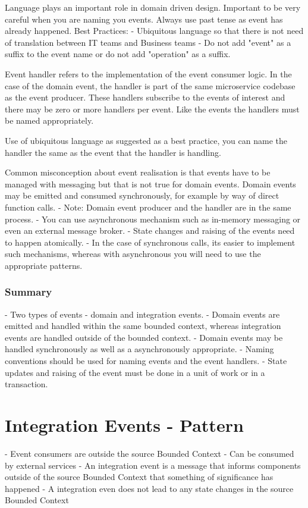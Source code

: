 Language plays an important role in domain driven design. Important to be very careful when you are naming you events.
Always use past tense as event has already happened.
Best Practices:
- Ubiquitous language so that there is not need of translation between IT teams and Business teams
- Do not add "event" as a suffix to the event name or do not add "operation" as a suffix.

Event handler refers to the implementation of the event consumer logic.
In the case of the domain event, the handler is part of the same microservice codebase as the event producer.
These handlers subscribe to the events  of interest and there may be zero or more handlers per event.
Like the events the handlers must be named appropriately.

Use of ubiquitous language as suggested as a best practice, you can name the handler the same as the event that the handler is handling.

Common misconception about event realisation is that events have to be managed with messaging but that is not true for domain events.
Domain events may be emitted and consumed synchronously, for example by way of direct function calls.
- Note: Domain event producer and the handler are in the same process.
- You can use asynchronous mechanism such as in-memory messaging or even an external message broker.
- State changes and raising of the events need to happen atomically.
- In the case of synchronous calls, its easier to implement such mechanisms, whereas with asynchronous you will need to use the appropriate patterns.

\subsubsection{Summary}
- Two types of events - domain and integration events.
- Domain events are emitted and handled within the same bounded context, whereas integration events are handled outside of the bounded context.
- Domain events may be handled synchronously as well as a asynchronously appropriate.
- Naming conventions should be used for naming events and the event handlers.
- State updates and raising of the event must be done in a unit of work or in a transaction.

\section{Integration Events - Pattern}
- Event consumers are outside the source Bounded Context
- Can be consumed by external services
- An integration event is a message that informs components outside of the source Bounded Context that something of significance has happened
- A integration even does not lead to any state changes in the source Bounded Context

